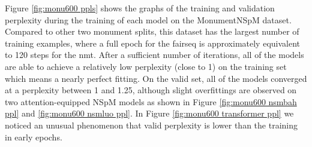 Figure \ref{fig:monu600 ppls} shows the graphs of the training and validation perplexity during the training of each model on the MonumentNSpM dataset. Compared to other two monument splits, this dataset has the largest number of training examples, where a full epoch for the fairseq is approximately equivalent to 120 steps for the nmt. After a sufficient number of iterations, all of the models are able to achieve a relatively low perplexity (close to 1) on the training set which means a nearly perfect fitting. On the valid set, all of the models converged at a perplexity between 1 and 1.25, although slight overfittings are observed on two attention-equipped NSpM models as shown in Figure \ref{fig:monu600 nsmbah ppl} and \ref{fig:monu600 nsmluo ppl}. In Figure \ref{fig:monu600 transformer ppl} we noticed an unusual phenomenon that valid perplexity is lower than the training in early epochs.

